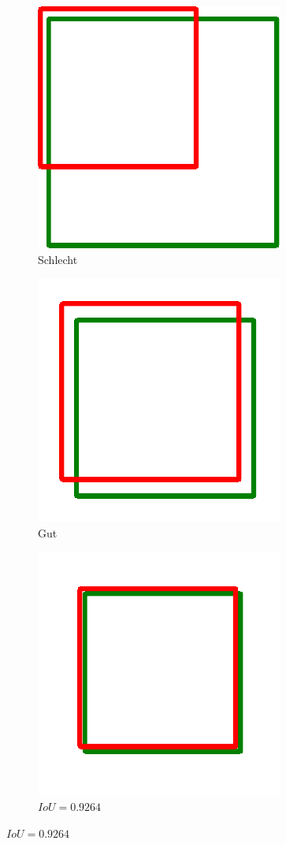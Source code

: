 \begin{figure}[h]
    \captionsetup{width=.9\linewidth}
    \caption{TODO}
    \label{fig:iou-examples}
    \centering
    \begin{subfigure}[b]{0.3\linewidth}
        \centering
        \caption*{$IoU=0.4034$}
        \includegraphics[width=0.5\linewidth]{graphics/iou/iou_examples/1.pdf}
        \caption*{Schlecht} 
        \vspace{2ex}
    \end{subfigure}%
    \begin{subfigure}[b]{0.3\linewidth}
        \centering
        \caption*{$IoU=0.7330$} 
        \includegraphics[width=0.5\linewidth]{graphics/iou/iou_examples/2.pdf}
        \caption*{Gut} 
        \vspace{2ex}
    \end{subfigure}%
    \begin{subfigure}[b]{0.3\linewidth}
        \centering
        \caption*{$IoU=0.9264$}
        \includegraphics[width=0.5\linewidth]{graphics/iou/iou_examples/3.pdf}

\end{subfigure}
\end{figure}
